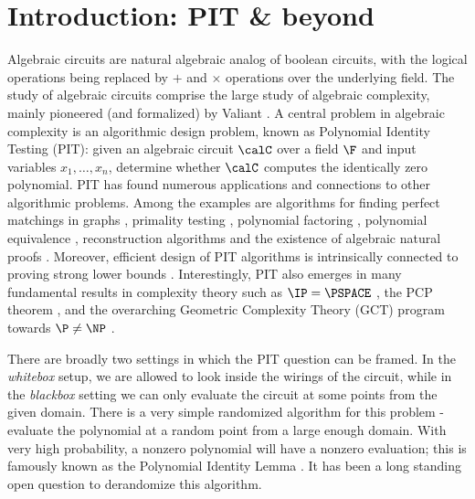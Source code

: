 \section{Introduction: PIT \& beyond}

Algebraic circuits are natural algebraic analog of boolean circuits, with the logical operations being replaced by $+$ and $\times$ operations over the underlying field. The study of algebraic circuits comprise the large study of algebraic complexity, mainly pioneered (and formalized) by Valiant \cite{valiant1979completeness}. A central problem in algebraic complexity is an algorithmic design problem, known as Polynomial Identity Testing (PIT): given an algebraic circuit $\calC$ over a field $\F$ and input variables $x_1,\hdots,x_n$, determine whether $\calC$ computes the identically zero polynomial. PIT has found numerous applications and connections to other algorithmic problems. Among the examples are algorithms for finding perfect matchings in graphs \cite{lovasz1979determinants, DBLP:journals/combinatorica/MulmuleyVV87,fenner2019bipartite}, primality testing \cite{agrawal2004primes}, polynomial factoring \cite{kopparty2014equivalence,dutta2018discovering}, polynomial equivalence \cite{dvir2014testing}, reconstruction algorithms \cite{klivans2006learning,shpilka2009interpolation,karnin2009reconstruction} and the existence of algebraic natural proofs \cite{chatterjee2020existence,kumar2020if}. Moreover, efficient design of PIT algorithms is intrinsically connected to proving strong lower bounds \cite{heintz1980testing,agrawal2005proving,kabanets2004derandomizing,dvir2010hardness,forbes2018succinct,chou2018hardness,dutta_et_al:LIPIcs.ITCS.2021.23}. Interestingly, PIT also emerges in many fundamental results in complexity theory such as $\IP=\PSPACE$ \cite{shamir1992ip,lund1992algebraic}, the PCP theorem \cite{arora1998proof,arora1998probabilistic}, and the overarching Geometric Complexity Theory (GCT) program towards $\P\ne\NP$ \cite{mulmuley2012gct,mulmuley2012geometric, grochow2015unifying,joshua16boundaries}. 

There are broadly two settings in which the PIT question can be framed. In the \emph{whitebox} setup, we are allowed to look inside the wirings of the circuit, while in the \emph{blackbox} setting we can only evaluate the circuit at some points from the given domain. There is a very simple randomized algorithm for this problem - evaluate the polynomial at a random point from a large enough domain. With very high probability, a nonzero polynomial will have a nonzero evaluation; this is famously known as the Polynomial Identity Lemma \cite{ore1922hohere,DL78,Zip79,schwartz1980fast}. It has been a
long standing open question to derandomize this algorithm.

